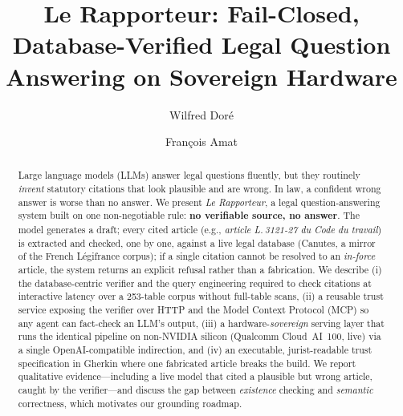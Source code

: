 \documentclass[sigconf, nonacm]{acmart}
\begin{document}
\title{Le Rapporteur: Fail-Closed, Database-Verified Legal
Question Answering on Sovereign Hardware}

\author{Wilfred Dor\'e}

\author{Fran\c{c}ois Amat}

\renewcommand{\shortauthors}{Dor\'e and Amat}

\begin{abstract}
Large language models (LLMs) answer legal questions fluently, but they
routinely \emph{invent} statutory citations that look plausible and are
wrong. In law, a confident wrong answer is worse than no answer. We present
\emph{Le Rapporteur}, a legal question-answering system built on one
non-negotiable rule: \textbf{no verifiable source, no answer}. The model
generates a draft; every cited article (e.g., \emph{article L.\,3121-27 du
Code du travail}) is extracted and checked, one by one, against a live legal
database (Canutes, a mirror of the French Légifrance corpus); if a single
citation cannot be resolved to an \emph{in-force} article, the system returns
an explicit refusal rather than a fabrication. We describe (i) the
database-centric verifier and the query engineering required to check
citations at interactive latency over a 253-table corpus without
full-table scans, (ii) a reusable trust service exposing the verifier over
HTTP and the Model Context Protocol (MCP) so any agent can fact-check an
LLM's output, (iii) a hardware-\emph{sovereign} serving layer that runs the
identical pipeline on non-NVIDIA silicon (Qualcomm Cloud~AI~100, live) via a
single OpenAI-compatible indirection, and (iv) an executable, jurist-readable
trust specification in Gherkin where one fabricated article breaks the build.
We report qualitative evidence---including a live model that cited a
plausible but wrong article, caught by the verifier---and discuss the gap
between \emph{existence} checking and \emph{semantic} correctness, which
motivates our grounding roadmap.
\end{abstract}


\maketitle
\end{document}

